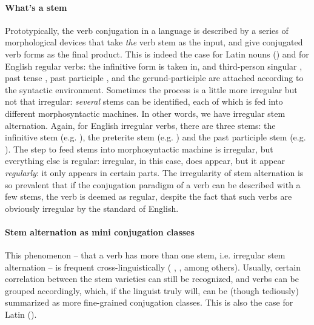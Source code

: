 {\paragraph{What's a stem} Prototypically, the verb conjugation in a language is described by 
a series of morphological devices that take \emph{the} verb stem as the input,
and give conjugated verb forms as the final product.
This is indeed the case for Latin nouns ()
and for English regular verbs:
the infinitive form is taken in,
and third-person singular , past tense , 
past participle , and the gerund-participle 
are attached according to the syntactic environment.
Sometimes the process is a little more irregular but not that irregular:
\emph{several} stems can be identified, each of which is fed into different morphosyntactic machines.
In other words, we have irregular stem alternation.
Again, for English irregular verbs,
there are three stems: the infinitive stem (e.g. ), 
the preterite stem (e.g. )
and the past participle stem (e.g. ).
The step to feed stems into morphosyntactic machine is irregular,
but everything else is regular:
irregular, in this case, does appear, but it appear \emph{regularly}:
it only appears in certain parts.
The irregularity of stem alternation is so prevalent
that if the conjugation paradigm of a verb can be described with a few stems,
the verb is deemed as regular, 
despite the fact that such verbs are obviously irregular by the standard of English.

\paragraph{Stem alternation as mini conjugation classes} 
This phenomenon -- that a verb has more than one stem, i.e. irregular stem alternation
-- is frequent cross-linguistically
(\citealt{jacques2021grammar} , \citealt{forker2020grammar} , among others).
Usually, certain correlation between the stem varieties can still be recognized,
and verbs can be grouped accordingly,
which, if the linguist truly will, 
can be (though tediously) summarized as more fine-grained conjugation classes.
This is also the case for Latin ().

}
